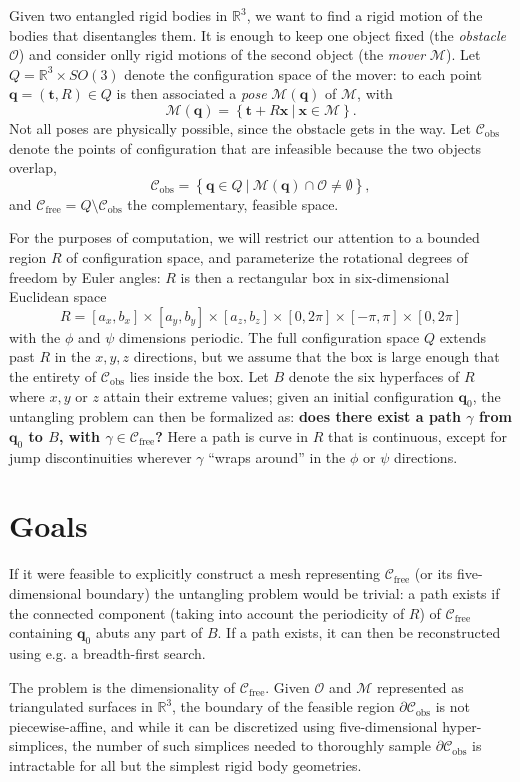 \documentclass[review]{acmsiggraph}
\newcommand{\cm}{\mathcal{M}}
\newcommand{\bx}{\mathbf{x}}
\newcommand{\bt}{\mathbf{t}}
\newcommand{\bq}{\mathbf{q}}
\newcommand{\Cfree}{\mathcal{C}_{\mathrm{free}}}
\newcommand{\Cobs}{\mathcal{C}_{\mathrm{obs}}}
\newcommand{\co}{\mathcal{O}}
\begin{document}
Given two entangled rigid bodies in $\mathbb{R}^3$, we want to find a rigid motion of the bodies that disentangles them. It is enough to keep one object fixed (the \emph{obstacle} $\co$) and consider onlly rigid motions of the second object (the \emph{mover} $\cm$). Let $Q = \mathbb{R}^3 \times SO(3)$ denote the configuration space of the mover: to each point $\bq = (\bt, R)\in Q$ is then associated a \emph{pose} $\cm(\bq)$ of $\cm$, with
$$\cm(\bq) = \left\{ \bt + R\bx\ \vert \ \bx \in \cm\right\}.$$
Not all poses are physically possible, since the obstacle gets in the way. Let $\Cobs$ denote the points of configuration that are infeasible because the two objects overlap,
$$\Cobs = \left\{\bq \in Q \ \vert \ \cm(\bq) \cap \co \neq \emptyset\right\},$$
and $\Cfree = Q \setminus \Cobs$ the complementary, feasible space. 

For the purposes of computation, we will restrict our attention to a bounded region $R$ of configuration space, and parameterize the rotational degrees of freedom by Euler angles: $R$ is then a rectangular box in six-dimensional Euclidean space
$$R = [a_x, b_x] \times [a_y, b_y] \times [a_z, b_z] \times [0,2\pi] \times [-\pi,\pi] \times [0, 2\pi]$$
with the $\phi$ and $\psi$ dimensions periodic. The full configuration space $Q$ extends past $R$ in the $x,y,z$ directions, but we assume that the box is large enough that the entirety of $\Cobs$ lies inside the box. Let $B$ denote the six hyperfaces of $R$ where $x,y$ or $z$ attain their extreme values; given an initial configuration $\bq_0$, the untangling problem can then be formalized as: \textbf{does there exist a path $\gamma$ from $\bq_0$ to $B$, with $\gamma \in \Cfree$?} Here a path is curve in $R$ that is continuous, except for jump discontinuities wherever $\gamma$ ``wraps around'' in the $\phi$ or $\psi$ directions.
\section{Goals}
If it were feasible to explicitly construct a mesh representing $\Cfree$ (or its five-dimensional boundary) the untangling problem would be trivial: a path exists if the connected component (taking into account the periodicity of $R$) of $\Cfree$ containing $\bq_0$ abuts any part of $B$. If a path exists, it can then be reconstructed using e.g. a breadth-first search.

The problem is the dimensionality of $\Cfree$. Given $\co$ and $\cm$ represented as triangulated surfaces in $\mathbb{R}^3$, the boundary of the feasible region $\partial \Cobs$ is not piecewise-affine, and while it can be discretized using five-dimensional hyper-simplices, the number of such simplices needed to thoroughly sample $\partial \Cobs$ is intractable for all but the simplest rigid body geometries.
\end{document}
